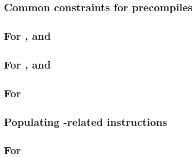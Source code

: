 \subsection{Common constraints for precompiles}                            \label{oob: precompiles: common precompiles: generalities}           \newpage
\subsection{For \oobInstEcrecover{}, \oobInstEcadd{} and \oobInstEcmul{}}  \label{oob: precompiles: common precompiles: one row precompiles}             \newpage
\subsection{For \oobInstShaTwo{}, \oobInstRipemd{} and \oobInstIdentity{}} \label{oob: precompiles: common precompiles: two row precompiles}             \newpage
\subsection{For \oobInstEcpairing{}}                                       \label{oob: precompiles: common precompiles: three row precompiles}           \newpage
\subsection{Populating -related \oobMod{} instructions}          \label{oob: precompiles: common precompiles: bls}                      \newpage                        
\subsection{For \oobInstPointEvaluation{}}                                 \label{oob: precompiles: common precompiles: point evaluation}          \newpage

